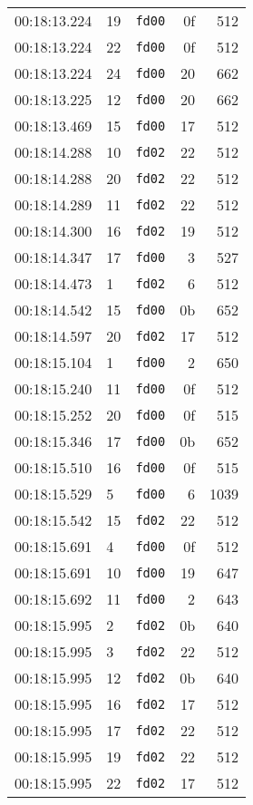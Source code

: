 \documentclass{article}
\begin{document}
\begin{longtable}{lllrr}
00:18:13.224 & 19 & \texttt{fd00} & 0f & 512 \\
00:18:13.224 & 22 & \texttt{fd00} & 0f & 512 \\
00:18:13.224 & 24 & \texttt{fd00} & 20 & 662 \\
00:18:13.225 & 12 & \texttt{fd00} & 20 & 662 \\
00:18:13.469 & 15 & \texttt{fd00} & 17 & 512 \\
00:18:14.288 & 10 & \texttt{fd02} & 22 & 512 \\
00:18:14.288 & 20 & \texttt{fd02} & 22 & 512 \\
00:18:14.289 & 11 & \texttt{fd02} & 22 & 512 \\
00:18:14.300 & 16 & \texttt{fd02} & 19 & 512 \\
00:18:14.347 & 17 & \texttt{fd00} & 3 & 527 \\
00:18:14.473 & 1 & \texttt{fd02} & 6 & 512 \\
00:18:14.542 & 15 & \texttt{fd00} & 0b & 652 \\
00:18:14.597 & 20 & \texttt{fd02} & 17 & 512 \\
00:18:15.104 & 1 & \texttt{fd00} & 2 & 650 \\
00:18:15.240 & 11 & \texttt{fd00} & 0f & 512 \\
00:18:15.252 & 20 & \texttt{fd00} & 0f & 515 \\
00:18:15.346 & 17 & \texttt{fd00} & 0b & 652 \\
00:18:15.510 & 16 & \texttt{fd00} & 0f & 515 \\
00:18:15.529 & 5 & \texttt{fd00} & 6 & 1039 \\
00:18:15.542 & 15 & \texttt{fd02} & 22 & 512 \\
00:18:15.691 & 4 & \texttt{fd00} & 0f & 512 \\
00:18:15.691 & 10 & \texttt{fd00} & 19 & 647 \\
00:18:15.692 & 11 & \texttt{fd00} & 2 & 643 \\
00:18:15.995 & 2 & \texttt{fd02} & 0b & 640 \\
00:18:15.995 & 3 & \texttt{fd02} & 22 & 512 \\
00:18:15.995 & 12 & \texttt{fd02} & 0b & 640 \\
00:18:15.995 & 16 & \texttt{fd02} & 17 & 512 \\
00:18:15.995 & 17 & \texttt{fd02} & 22 & 512 \\
00:18:15.995 & 19 & \texttt{fd02} & 22 & 512 \\
00:18:15.995 & 22 & \texttt{fd02} & 17 & 512 \\

\end{longtable}
\end{document}
